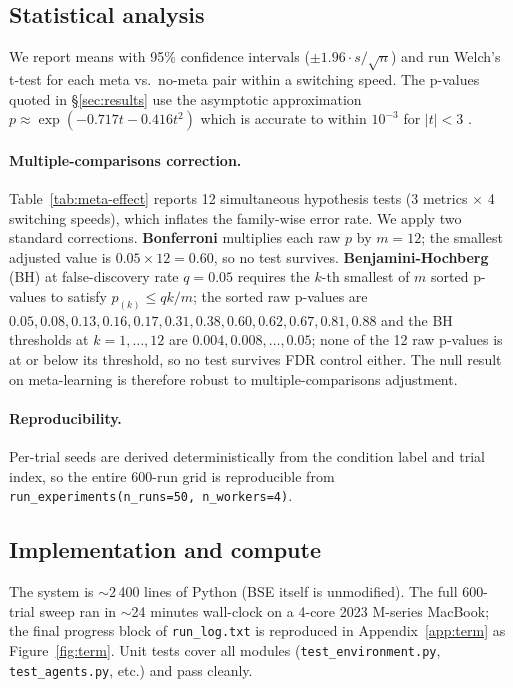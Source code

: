 \documentclass[11pt,a4paper]{article}
\begin{document}
\subsection{Statistical analysis}\label{sec:stats}
We report means with 95\% confidence intervals
($\pm 1.96 \cdot s/\!\sqrt{n}$) and run Welch's t-test for each
meta vs.\ no-meta pair within a switching speed. The p-values quoted in
\S\ref{sec:results} use the asymptotic approximation
$p \approx \exp(-0.717 t - 0.416 t^2)$ which is accurate to within
$10^{-3}$ for $|t|<3$ \cite{abramowitz1964handbook}.

\paragraph{Multiple-comparisons correction.}
Table~\ref{tab:meta-effect} reports 12 simultaneous hypothesis tests
(3 metrics $\times$ 4 switching speeds), which inflates the family-wise
error rate. We apply two standard corrections. \textbf{Bonferroni}
multiplies each raw $p$ by $m=12$; the smallest adjusted value is
$0.05\times 12 = 0.60$, so no test survives. \textbf{Benjamini-Hochberg}
(BH) at false-discovery rate $q=0.05$ requires the $k$-th smallest of $m$
sorted p-values to satisfy $p_{(k)} \le qk/m$; the sorted raw p-values
are $0.05, 0.08, 0.13, 0.16, 0.17, 0.31, 0.38, 0.60, 0.62, 0.67, 0.81, 0.88$
and the BH thresholds at $k=1,\ldots,12$ are
$0.004, 0.008, \ldots, 0.05$; none of the 12 raw p-values is at or below
its threshold, so no test survives FDR control either. The null result on
meta-learning is therefore robust to multiple-comparisons adjustment.

\paragraph{Reproducibility.}
Per-trial seeds are derived deterministically from the condition label and
trial index, so the entire $600$-run grid is reproducible from
\texttt{run\_experiments(n\_runs=50, n\_workers=4)}.

\subsection{Implementation and compute}
The system is $\sim$2\,400 lines of Python (BSE itself is unmodified). The
full $600$-trial sweep ran in $\sim$24 minutes wall-clock on a 4-core 2023
M-series MacBook; the final progress block of \texttt{run\_log.txt} is
reproduced in Appendix~\ref{app:term} as Figure~\ref{fig:term}. Unit tests
cover all modules (\texttt{test\_environment.py},
\texttt{test\_agents.py}, etc.) and pass cleanly.
\end{document}
